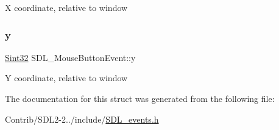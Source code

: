 X coordinate, relative to window \mbox{\label{struct_s_d_l___mouse_button_event_a7ccb5c55a7ddadce723f4ea6d5269540}} 
\subsubsection{\texorpdfstring{y}{y}}
{\footnotesize\ttfamily \mbox{\hyperlink{_s_d_l__stdinc_8h_a7a90b941db9d4582e9ad7abb9940ff7e}{Sint32}} S\+D\+L\+\_\+\+Mouse\+Button\+Event\+::y}

Y coordinate, relative to window 

The documentation for this struct was generated from the following file\+:\begin{DoxyCompactItemize}
\item 
Contrib/\+S\+D\+L2-\/2../include/\mbox{\hyperlink{_s_d_l__events_8h}{S\+D\+L\+\_\+events.\+h}}\end{DoxyCompactItemize}
